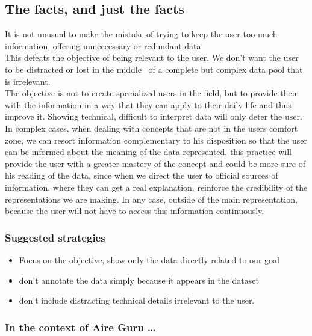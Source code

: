 \subsection{The facts, and just the facts}

It is not unusual to make the mistake of trying to keep the user too much information, offering unneccessary or redundant data.\\
 
This defeats the objective of being relevant to the user. We don't want the user to be distracted or lost in the middle
 of a complete but complex data pool that is irrelevant.\\

The objective is not to create specialized users in the field, but to provide them with the
information in a way that they can apply to their daily life and thus improve it. Showing
technical, difficult to interpret data will only deter the user. \\

In complex cases, when dealing with concepts that are not in the users comfort zone, we can resort information
complementary to his disposition so that the user can be informed about the meaning of the data
represented, this practice will provide the user with a greater mastery of the concept and could be more
sure of his reading of the data, since when we direct the user to official sources of information, where they can
get a real explanation, reinforce the credibility of the representations we are making. In any case,
outside of the main representation, because the user will not have to access this information continuously.\\

\subsubsection*{Suggested strategies}

\begin{itemize}
    \item Focus on the objective, show only the data directly related to our goal
    \item don't annotate the data simply because it appears in the dataset
    \item don't include distracting technical details irrelevant to the user.
\end{itemize}

\subsubsection*{In the context of Aire Guru \ldots} 


